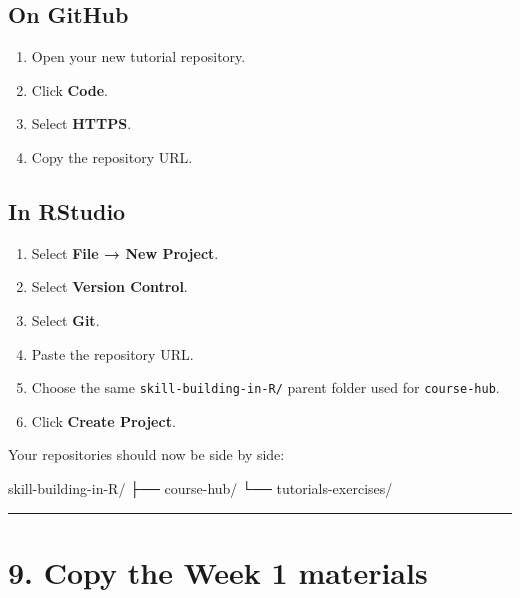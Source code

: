 \documentclass[
  letterpaper,
  DIV=11,
  numbers=noendperiod]{scrartcl}
\newenvironment{Shaded}{\begin{snugshade}}{\end{snugshade}}
\newcommand{\NormalTok}[1]{\textcolor[rgb]{0.00,0.23,0.31}{#1}}
\providecommand{\tightlist}{%
  \setlength{\itemsep}{0pt}\setlength{\parskip}{0pt}}
\begin{document}
\subsection{On GitHub}\label{on-github-2}

\begin{enumerate}
\def\labelenumi{\arabic{enumi}.}
\tightlist
\item
  Open your new tutorial repository.
\item
  Click \textbf{Code}.
\item
  Select \textbf{HTTPS}.
\item
  Copy the repository URL.
\end{enumerate}

\subsection{In RStudio}\label{in-rstudio-1}

\begin{enumerate}
\def\labelenumi{\arabic{enumi}.}
\tightlist
\item
  Select \textbf{File → New Project}.
\item
  Select \textbf{Version Control}.
\item
  Select \textbf{Git}.
\item
  Paste the repository URL.
\item
  Choose the same \texttt{skill-building-in-R/} parent folder used for
  \texttt{course-hub}.
\item
  Click \textbf{Create Project}.
\end{enumerate}

Your repositories should now be side by side:

\begin{Shaded}
\begin{Highlighting}[]
\NormalTok{skill{-}building{-}in{-}R/}
\NormalTok{├── course{-}hub/}
\NormalTok{└── tutorials{-}exercises/}
\end{Highlighting}
\end{Shaded}

\begin{center}\rule{0.5\linewidth}{0.5pt}\end{center}

\section{9. Copy the Week 1 materials}\label{copy-the-week-1-materials}
\end{document}

